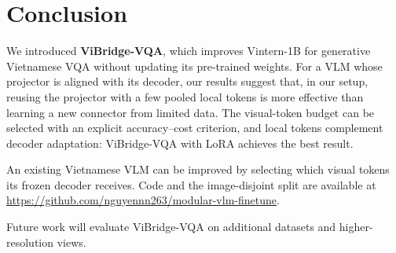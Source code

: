 \section{Conclusion}
\label{sec:conclusion}

We introduced \textbf{ViBridge-VQA}, which improves Vintern-1B for generative Vietnamese VQA
without updating its pre-trained weights. For a VLM whose projector is aligned with its decoder,
our results suggest that, in our setup, reusing the projector with a few pooled local tokens is
more effective than learning a new connector from limited data. The visual-token budget can be
selected with an explicit accuracy--cost criterion, and local tokens complement decoder adaptation:
ViBridge-VQA with LoRA achieves the best result.

An existing Vietnamese VLM can be improved by selecting which visual tokens its frozen decoder
receives. Code and the image-disjoint split are available at
\url{https://github.com/nguyennn263/modular-vlm-finetune}.

Future work will evaluate ViBridge-VQA on additional datasets and higher-resolution views.
